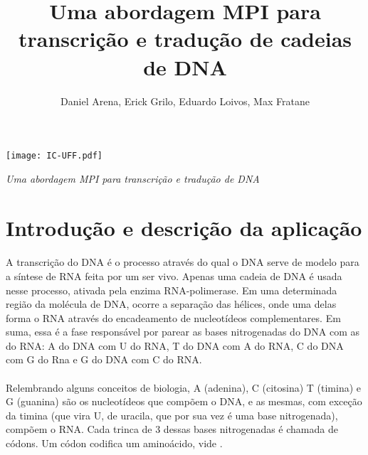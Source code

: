 \documentclass[a4paper,10pt]{article}
\title{Uma abordagem MPI para transcrição e tradução de cadeias de DNA}
\author{Daniel Arena, Erick Grilo, Eduardo Loivos, Max Fratane}
\begin{document}
\begin{flushright}
\thispagestyle{empty}
\texttt{[image: IC-UFF.pdf]}
\end{flushright}

\begin{center}
\vfill
\vspace{-7em}
\emph{\Large Uma abordagem MPI para transcrição e tradução de DNA}
\begin{flushright}
\vspace{1em}
\end{flushright}
\vfill
\end{center}

\newpage
\newpage

\section{Introdução e descrição da aplicação}
\paragraph{}A transcrição do DNA é o processo através do qual o DNA serve de modelo para a síntese de RNA feita por um ser vivo. Apenas uma cadeia de DNA é usada nesse processo, ativada pela enzima RNA-polimerase. Em uma determinada região da molécula de DNA, ocorre a separação das hélices, onde uma delas forma o RNA através do encadeamento de nucleotídeos complementares. Em suma, essa é a fase responsável por parear as bases nitrogenadas do DNA com as do RNA: A do DNA com U do RNA, T do DNA com A do RNA, C do DNA com G do Rna e G do DNA com C do RNA.

\paragraph{}Relembrando alguns conceitos de biologia, A (adenina), C (citosina) T (timina) e G (guanina) são os nucleotídeos que compõem o DNA, e as mesmas, com exceção da timina (que vira U, de uracila, que por sua vez é uma base nitrogenada), compõem o RNA. Cada trinca de 3 dessas bases nitrogenadas é chamada de códons. Um códon codifica um aminoácido, vide \citet{objetivo}.
\end{document}
